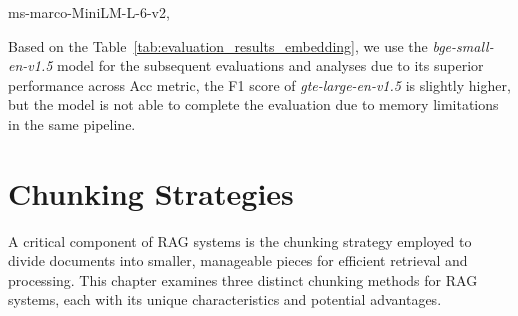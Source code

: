 \begin{table}[h!]
    \centering
    \noindent
    {\scriptsize ms-marco-MiniLM-L-6-v2,}\\
    \caption{Evaluation Results for Different Embedding Models through the Pipeline (just with the Gemma2 model)}
    \label{tab:evaluation_results_embedding}
\end{table}

Based on the Table~\ref{tab:evaluation_results_embedding}, we use the \textit{bge-small-en-v1.5} model for the subsequent evaluations and analyses due to its superior performance across Acc metric, the F1 score of \textit{gte-large-en-v1.5} is slightly higher, but the model is not able to complete the evaluation due to memory limitations in the same pipeline.

\section{Chunking Strategies}\label{sec:chunking-strategies}
A critical component of \ac{RAG} systems is the chunking strategy employed to divide documents into smaller, manageable pieces for efficient retrieval and processing.
This chapter examines three distinct chunking methods for \ac{RAG} systems, each with its unique characteristics and potential advantages.

